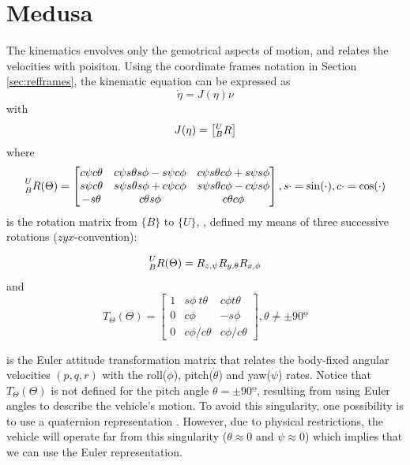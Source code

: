 \section{Medusa}
\label{sec:medusamodelequations}

\par The kinematics envolves only the gemotrical aspects of motion, and relates the velocities with poisiton. Using the coordinate frames notation in Section \ref{sec:refframes}, the kinematic equation can be expressed as
\begin{equation}
    \dot{\eta} = J(\eta)\nu
\end{equation}
with 
\begin{equation}
    J(\eta) = \begin{bmatrix}
        \prescript{U}{B}{R}
    \end{bmatrix}
\end{equation}
where
\begin{equation}
    \prescript{U}{B}{R(\Theta)} = \begin{bmatrix}
        c\psi c\theta & c\psi s\theta s\phi-s \psi c\phi & c\psi s\theta c\phi+s\psi s\phi \\
        s\psi c\theta & s\psi s\theta s\phi+c\psi c\phi & s\psi s\theta c\phi-c\psi s\phi \\
        -s\theta & c\theta s\phi & c\theta c\phi
    \end{bmatrix}, s\cdot = \sin(\cdot), c\cdot=\cos(\cdot)
\end{equation}
is the rotation matrix from $\{B\}$ to $\{U\}$, \cite{fossen2006nonlinear}, defined my means of three successive rotations ($zyx$-convention):

\begin{equation}
    \prescript{U}{B}{R(\Theta)} = R_{z,\psi}R_{y,\theta}R_{x,\phi}
\end{equation}
and
\begin{equation}
    T_{\Theta}(\Theta) = \begin{bmatrix}
        1 & s\phi\ t\theta & c\phi t\theta \\
        0 & c\phi & -s\phi \\
        0 & c\phi / c\theta & c\phi / c\theta 
    \end{bmatrix}, \theta \neq \pm 90º
\end{equation}

is the Euler attitude transformation matrix that relates the body-fixed angular velocities $(p, q, r)$ with the roll($\dot{\phi}$), pitch($\dot{\theta}$) and yaw($\dot{\psi}$) rates. Notice that $T_\Theta(\Theta)$ is not defined for the pitch angle $\theta = \pm90º$, resulting from using Euler angles to describe the vehicle’s motion. To avoid this singularity, one possibility is to use a quaternion representation \cite{fossen2006nonlinear}. However, due to physical restrictions, the vehicle will operate far from this singularity ($\theta\approx 0$ and $\psi \approx 0$) which implies that we can use the Euler representation.


